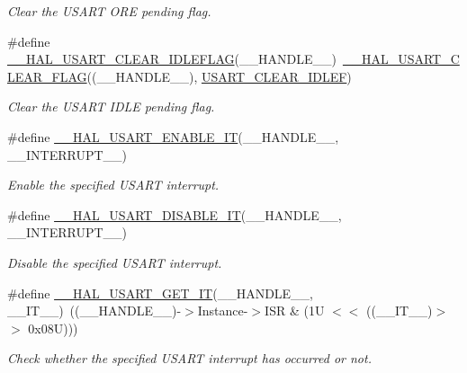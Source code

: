 \begin{DoxyCompactItemize}
\begin{DoxyCompactList}\small\item\em Clear the U\+S\+A\+RT O\+RE pending flag. \end{DoxyCompactList}\item 
\#define \hyperlink{group___u_s_a_r_t___exported___macros_ga9805694ed8725e6b1f52c5f16cf7bbef}{\+\_\+\+\_\+\+H\+A\+L\+\_\+\+U\+S\+A\+R\+T\+\_\+\+C\+L\+E\+A\+R\+\_\+\+I\+D\+L\+E\+F\+L\+AG}(\+\_\+\+\_\+\+H\+A\+N\+D\+L\+E\+\_\+\+\_\+)~\hyperlink{group___u_s_a_r_t___exported___macros_gaff3cb6ff740b240764e7844eaf3d6807}{\+\_\+\+\_\+\+H\+A\+L\+\_\+\+U\+S\+A\+R\+T\+\_\+\+C\+L\+E\+A\+R\+\_\+\+F\+L\+AG}((\+\_\+\+\_\+\+H\+A\+N\+D\+L\+E\+\_\+\+\_\+), \hyperlink{group___u_s_a_r_t___i_t___c_l_e_a_r___flags_gad9927597dca4f88a05c0d5151049470a}{U\+S\+A\+R\+T\+\_\+\+C\+L\+E\+A\+R\+\_\+\+I\+D\+L\+EF})
\begin{DoxyCompactList}\small\item\em Clear the U\+S\+A\+RT I\+D\+LE pending flag. \end{DoxyCompactList}\item 
\#define \hyperlink{group___u_s_a_r_t___exported___macros_ga2258521c741456b4254064958ca7ef51}{\+\_\+\+\_\+\+H\+A\+L\+\_\+\+U\+S\+A\+R\+T\+\_\+\+E\+N\+A\+B\+L\+E\+\_\+\+IT}(\+\_\+\+\_\+\+H\+A\+N\+D\+L\+E\+\_\+\+\_\+,  \+\_\+\+\_\+\+I\+N\+T\+E\+R\+R\+U\+P\+T\+\_\+\+\_\+)
\begin{DoxyCompactList}\small\item\em Enable the specified U\+S\+A\+RT interrupt. \end{DoxyCompactList}\item 
\#define \hyperlink{group___u_s_a_r_t___exported___macros_gad1cd8973d175b1b031f21aff3101f5fd}{\+\_\+\+\_\+\+H\+A\+L\+\_\+\+U\+S\+A\+R\+T\+\_\+\+D\+I\+S\+A\+B\+L\+E\+\_\+\+IT}(\+\_\+\+\_\+\+H\+A\+N\+D\+L\+E\+\_\+\+\_\+,  \+\_\+\+\_\+\+I\+N\+T\+E\+R\+R\+U\+P\+T\+\_\+\+\_\+)
\begin{DoxyCompactList}\small\item\em Disable the specified U\+S\+A\+RT interrupt. \end{DoxyCompactList}\item 
\#define \hyperlink{group___u_s_a_r_t___exported___macros_ga9a42d011180e600b09dc3e918982d856}{\+\_\+\+\_\+\+H\+A\+L\+\_\+\+U\+S\+A\+R\+T\+\_\+\+G\+E\+T\+\_\+\+IT}(\+\_\+\+\_\+\+H\+A\+N\+D\+L\+E\+\_\+\+\_\+,  \+\_\+\+\_\+\+I\+T\+\_\+\+\_\+)~((\+\_\+\+\_\+\+H\+A\+N\+D\+L\+E\+\_\+\+\_\+)-\/$>$Instance-\/$>$I\+SR \& (1\+U $<$$<$ ((\+\_\+\+\_\+\+I\+T\+\_\+\+\_\+)$>$$>$ 0x08\+U)))
\begin{DoxyCompactList}\small\item\em Check whether the specified U\+S\+A\+RT interrupt has occurred or not. \end{DoxyCompactList}\item 

\end{DoxyCompactItemize}
